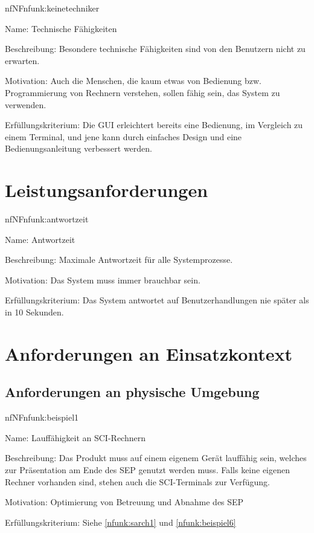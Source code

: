 \begin{description}[leftmargin=5em, style=sameline]	
	\begin{lhp}{nf}{NF}{nfunk:keinetechniker}
		\item [Name:] Technische Fähigkeiten
		\item [Beschreibung:] Besondere technische Fähigkeiten sind von den Benutzern nicht zu erwarten.
		\item [Motivation:] Auch die Menschen, die kaum etwas von Bedienung bzw. Programmierung von Rechnern verstehen, sollen fähig sein, das System zu verwenden.
		\item [Erfüllungskriterium:] Die GUI erleichtert bereits eine Bedienung, im Vergleich zu einem Terminal, und jene kann durch einfaches Design und eine Bedienungsanleitung verbessert werden.
	\end{lhp}
\end{description}

\section{Leistungsanforderungen}

\begin{description}[leftmargin=5em, style=sameline]	
	\begin{lhp}{nf}{NF}{nfunk:antwortzeit}
		\item [Name:] Antwortzeit
		\item [Beschreibung:] Maximale Antwortzeit für alle Systemprozesse.
		\item [Motivation:] Das System muss immer brauchbar sein.
		\item [Erfüllungskriterium:] Das System antwortet auf Benutzerhandlungen nie später als in 10 Sekunden.
	\end{lhp}
\end{description}

\section{Anforderungen an Einsatzkontext}

\subsection{Anforderungen an physische Umgebung}

\begin{description}[leftmargin=5em, style=sameline]	
	\begin{lhp}{nf}{NF}{nfunk:beispiel1}
		\item [Name:] Lauffähigkeit an SCI-Rechnern
		\item [Beschreibung:] Das Produkt muss auf einem eigenem Gerät lauffähig sein, welches zur Präsentation am Ende des SEP genutzt werden muss. Falls keine eigenen Rechner vorhanden sind, stehen auch die SCI-Terminals zur Verfügung.
		\item [Motivation:] Optimierung von Betreuung und Abnahme des SEP
		\item [Erfüllungskriterium:] Siehe \ref{nfunk:sarch1} und \ref{nfunk:beispiel6}
	\end{lhp}
\end{description}


